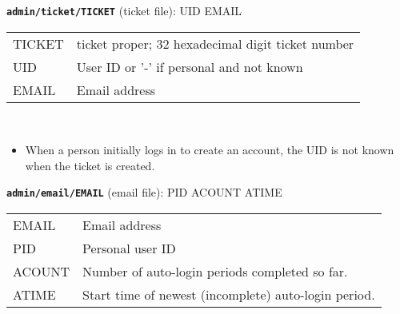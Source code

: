 \documentclass[12pt]{article}
\newenvironment{indpar}[1][0.4in]%
	{\begin{list}{}%
		     {\setlength{\itemsep}{0in}%
		      \setlength{\topsep}{0in}%
		      \setlength{\parsep}{1ex}%
		      \setlength{\labelwidth}{#1}%
		      \setlength{\leftmargin}{#1}%
		      \addtolength{\leftmargin}{\labelsep}}%
	 \item}%
	{\end{list}}
\newenvironment{itemlist}[1][0.2in]%
	{\begin{list}{}{\setlength{\labelwidth}{#1}%
		        \setlength{\leftmargin}{\labelwidth}%
		        \addtolength{\leftmargin}{+0.2in}%
		        \addtolength{\linewidth}{-\labelwidth}%
		        \addtolength{\linewidth}{-0.2in}%
		        \renewcommand{\makelabel}[1]{##1\hfill}}
	 \raggedright}%
	{\end{list}}
\newcommand{\TT}[1]{{\tt \bfseries #1}}
\begin{document}
\begin{indpar}
\begin{itemlist}
\item[\TT{admin/ticket/TICKET} (ticket file):] UID EMAIL
\label{ADMIN/TICKET/TICKET} \\
\begin{tabular}[t]{lp{4.0in}}
TICKET & ticket proper; 32 hexadecimal digit ticket number \\
UID & User ID or '-' if personal and not known \\
EMAIL & Email address \\
\end{tabular}
\\
\begin{itemize}
\item When a person initially logs in to create an account,
the UID is not known when the ticket is created.
\end{itemize}

\item[\TT{admin/email/EMAIL} (email file):] PID ACOUNT ATIME
\label{ADMIN/EMAIL/EMAIL} \\
\begin{tabular}[t]{lp{4.0in}}
EMAIL & Email address \\
PID & Personal user ID \\
ACOUNT & Number of auto-login periods completed so far. \\
ATIME & Start time of newest (incomplete) auto-login period. \\
\end{tabular}


\end{itemlist}
\end{indpar}
\end{document}
